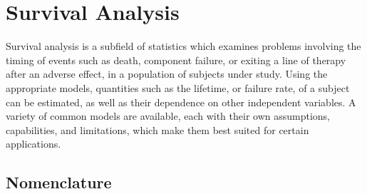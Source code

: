 \section{Survival Analysis}
\label{additional:Survival}

Survival analysis is a subfield of statistics which examines problems involving the timing of events
such as death, component failure, or exiting a line of therapy after an adverse effect, in a population of subjects under study.
Using the appropriate models, quantities such as the lifetime, or failure rate, of a subject
can be estimated, as well as their dependence on other independent variables.
A variety of common models are available,
each with their own assumptions, capabilities, and limitations,
which make them best suited for certain applications.

\subsection{Nomenclature}
\label{additional:Survival:Nomenclature}

